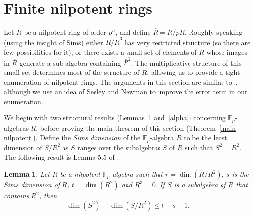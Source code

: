 \documentclass[12pt]{article}
\newtheorem{Lem}[Thm]{Lemma}
\begin{document}
\section{Finite nilpotent rings}
\label{Nilpotent case}

Let $R$ be a nilpotent ring of order $p^n$, and define $\overline{R}=R/{pR}$. Roughly speaking (using the insight of Sims) either $\overline{R}/\overline{R}^3$ has very restricted structure (so there are few possibilities for it), or there exists a small set of elements of $R$ whose images in $\overline{R}$ generate a sub-algebra containing $\overline{R}^2$. The multiplicative structure of this small set determines most of the structure of $R$, allowing us to provide a tight enumeration of nilpotent rings. The arguments in this section are similar to~\cite{K & P}, although we use an idea of Seeley and Newman to improve the error term in our enumeration. 

We begin with two structural results (Lemmas~\ref{cube zero} and~\ref{alpha}) concerning $\mathbb{F}_p$-algebras $R$, before proving the main theorem of this section (Theorem~\ref{main nilpotent}). Define the \textit{Sims dimension} of the $\mathbb{F}_p$-algebra $R$ to be the least dimension of $S/R^{2}$ as $S$ ranges over the subalgebras $S$ of $R$ such that $S^{2} = R^{2}$. The following result is Lemma 5.5 of \cite {K & P}.

\begin{Lem} \label{cube zero}
Let $R$ be a nilpotent $\mathbb{F}_{p}$-algebra such that $r = \dim(R/R^{2})$, $s$ is the Sims dimension of $R$, $t = \dim(R^{2})$ and $R^{3} = 0$. If $S$ is a subalgebra of $R$ that contains $R^{2}$, then
\begin{displaymath}
\dim(S^{2}) - \dim(S/R^{2}) \leq t - s + 1.
\end{displaymath}
\end{Lem}
\end{document}
